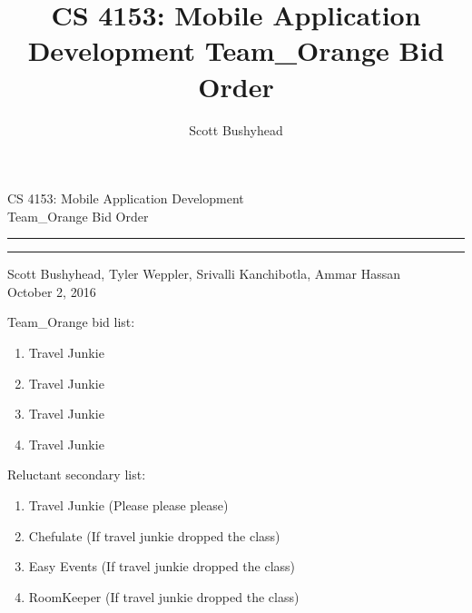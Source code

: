 \documentclass [10pt] {article}
\title{CS 4153: Mobile Application Development \newline
Team\_Orange Bid Order}
\author{Scott Bushyhead}
\begin{document}
\begin{flushright}
{\huge  CS 4153: Mobile Application Development}\\[5pt]
{\huge  Team\_Orange Bid Order}\\[15pt]
\vspace{4pt}
\hrule
\vspace{4pt}
\hrule
{\large  Scott Bushyhead, Tyler Weppler, Srivalli Kanchibotla, Ammar Hassan}\\[5pt]
{\large October 2, 2016}\\[5pt]
\end{flushright}

\newpage



Team\_Orange bid list:
\begin{enumerate}
\item Travel Junkie
\item Travel Junkie
\item Travel Junkie
\item Travel Junkie
\end{enumerate}

Reluctant secondary list:
\begin{enumerate}
\item Travel Junkie (Please please please)
\item Chefulate (If travel junkie dropped the class)
\item Easy Events (If travel junkie dropped the class)
\item RoomKeeper (If travel junkie dropped the class)
\end{enumerate}
\end{document}
